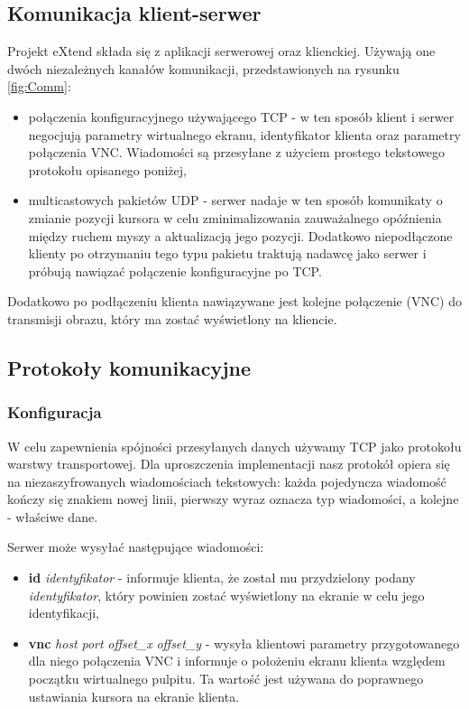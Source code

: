   \subsection{Komunikacja klient-serwer}

    Projekt eXtend składa się z aplikacji serwerowej oraz klienckiej. Używają one dwóch niezależnych kanałów komunikacji, przedstawionych na rysunku \ref{fig:Comm}:
    \begin{itemize}
      \item połączenia konfiguracyjnego używającego TCP - w ten sposób klient i serwer negocjują parametry wirtualnego ekranu, identyfikator klienta oraz parametry połączenia VNC. Wiadomości są przesyłane z użyciem prostego tekstowego protokołu opisanego poniżej,
      \item multicastowych pakietów UDP - serwer nadaje w ten sposób komunikaty o zmianie pozycji kursora w celu zminimalizowania zauważalnego opóźnienia między ruchem myszy a aktualizacją jego pozycji. Dodatkowo niepodłączone klienty po otrzymaniu tego typu pakietu traktują nadawcę jako serwer i próbują nawiązać połączenie konfiguracyjne po TCP.
    \end{itemize}

    Dodatkowo po podłączeniu klienta nawiązywane jest kolejne połączenie (VNC) do transmisji obrazu, który ma zostać wyświetlony na kliencie.

  \subsection{Protokoły komunikacyjne}

    \subsubsection{Konfiguracja}

      W celu zapewnienia spójności przesyłanych danych używamy TCP jako protokołu warstwy transportowej. Dla uproszczenia implementacji nasz protokół opiera się na niezaszyfrowanych wiadomościach tekstowych: każda pojedyncza wiadomość kończy się znakiem nowej linii, pierwszy wyraz oznacza typ wiadomości, a kolejne - właściwe dane.

      Serwer może wysyłać następujące wiadomości:
      \begin{itemize}
        \item \textbf{id} \emph{identyfikator} - informuje klienta, że został mu przydzielony podany \emph{identyfikator}, który powinien zostać wyświetlony na ekranie w celu jego identyfikacji,
        \item \textbf{vnc} \emph{host} \emph{port} \emph{offset\_x} \emph{offset\_y} - wysyła klientowi parametry przygotowanego dla niego połączenia VNC i informuje o położeniu ekranu klienta względem początku wirtualnego pulpitu. Ta wartość jest używana do poprawnego ustawiania kursora na ekranie klienta.
      \end{itemize}

